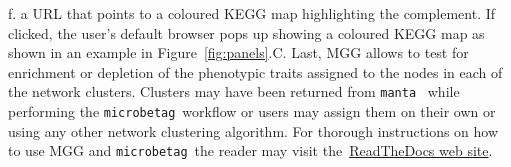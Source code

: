 \documentclass[sn-mathphys,Numbered]{sn-jnl}  %
\theoremstyle{thmstyleone}%
\theoremstyle{thmstyletwo}%
\theoremstyle{thmstylethree}%
\newcommand{\microbetag}{\texttt{microbetag}}
\begin{document}
        f. a URL that points to a coloured KEGG map highlighting the complement.
        If clicked, the user's default browser pops up showing a coloured KEGG map as shown in an example in Figure~\ref{fig:panels}.C.
        Last, MGG allows to test for enrichment or depletion of the phenotypic traits assigned to the nodes in each of the network clusters. 
        Clusters may have been returned from \texttt{manta}~\cite{rottjers2020manta} while performing the \microbetag~workflow or users may assign them on their own or using any other network clustering algorithm.
        For thorough instructions on how to use MGG and \microbetag~the reader may visit the~\href{https://hariszaf.github.io/microbetag/docs/cytoApp/}{ReadTheDocs web site}.

        \newpage
\end{document}
